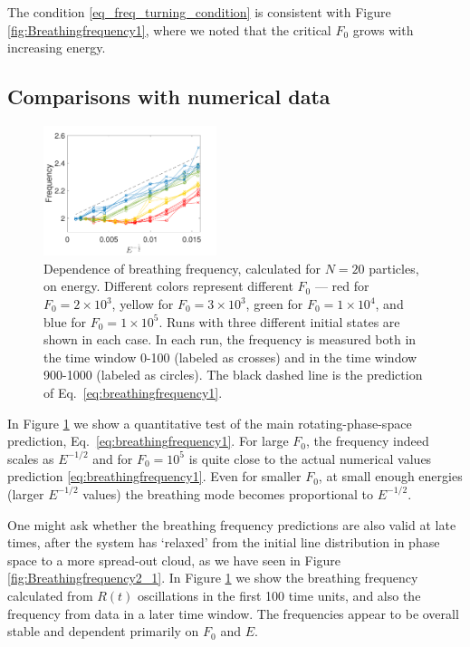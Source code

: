 \documentclass[a4paper, onecolumn]{revtex4-1}
\begin{document}
The condition \eqref{eq_freq_turning_condition} is consistent with Figure
\ref{fig:Breathingfrequency1}, where we noted that the critical $F_0$ grows with increasing energy.


\subsection{Comparisons with numerical data}


\begin{figure}[tb]
\centering
\includegraphics[width=0.45\textwidth]{ZhiyuPictures/N_20_freq_vs_E_a.pdf}
\caption{Dependence of breathing frequency, calculated for $N=20$ particles, on energy.  Different
  colors represent different $F_0$ --- red for $F_0=2\times10^3$, yellow for $F_0=3\times10^3$,
  green for $F_0=1\times10^4$, and blue for $F_0=1\times10^5$.  Runs with three different initial
  states are shown in each case.  In each run, the frequency is measured both in the time window
  0-100 (labeled as crosses) and in the time window 900-1000 (labeled as circles). The black dashed
  line is the prediction of Eq.~\eqref{eq:breathingfrequency1}.}
\label{fig:Breathingfrequency4}
\end{figure}


In Figure \ref{fig:Breathingfrequency4} we show a quantitative test of the main rotating-phase-space
prediction, Eq.~\eqref{eq:breathingfrequency1}.  For large $F_0$, the frequency indeed scales as
$E^{-1/2}$ and for $F_0=10^5$ is quite close to the actual numerical values prediction
\eqref{eq:breathingfrequency1}.  Even for smaller $F_0$, at small enough energies (larger $E^{-1/2}$
values) the breathing mode becomes proportional to  $E^{-1/2}$. 

One might ask whether the breathing frequency predictions are also valid at late times, after the
system has `relaxed' from the initial line distribution in phase space to a more spread-out cloud,
as we have seen in Figure \ref{fig:Breathingfrequency2_1}.  In Figure \ref{fig:Breathingfrequency4}
we show the breathing frequency calculated from $R(t)$ oscillations in the first 100 time units, and
also the frequency from data in a later time window. The frequencies appear to be overall stable and
dependent primarily on $F_0$ and $E$.
\end{document}
